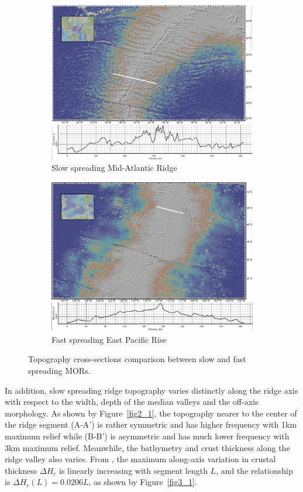 \documentclass[12pt]{article}
\begin{document}
\begin{figure}[H]
\centering
\begin{subfigure}{.5\textwidth}
  \centering
  \includegraphics[width=.8\linewidth]{fig1_1.png}
  \caption{\small{Slow spreading Mid-Atlantic Ridge}}
  \label{fig1_1}
\end{subfigure}%
\begin{subfigure}{.5\textwidth}
  \centering
  \includegraphics[width=.8\linewidth]{fig1_3.png}
  \caption{\small{Fast spreading East Pacific Rise}}
  \label{fig1_3}
\end{subfigure}
\caption{\small{Topography cross-sections comparison between slow and fast spreading MORs.}}
\label{fig1}
\end{figure}
In addition, slow spreading ridge topography varies distinctly along the ridge axis with respect to the width, depth of the median valleys and the off-axis morphology. As shown by Figure~\ref{fig2_1}, the topography nearer to the center of the ridge segment (A-A') is rather symmetric and has higher frequency with 1km maximum relief while (B-B') is asymmetric and has much lower frequency with 3km maximum relief. Meanwhile, the bathymetry and crust thickness along the ridge valley also varies. From \citep{Chen1999}, the maximum along-axis variation in crustal thickness $\Delta H_{c}$ is linearly increasing with segment length $L$, and the relationship is $\Delta H_{c}(L)=0.0206L$, as shown by Figure~\ref{fig3_1}.
\end{document}
